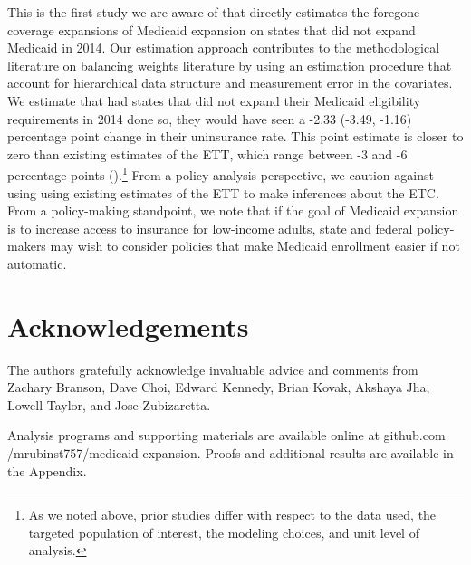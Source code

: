 \documentclass[aoas]{imsart}
\theoremstyle{plain}
\theoremstyle{remark}
\begin{document}
This is the first study we are aware of that directly estimates the foregone coverage expansions of Medicaid expansion on states that did not expand Medicaid in 2014. Our estimation approach contributes to the methodological literature on balancing weights literature by using an estimation procedure that account for hierarchical data structure and measurement error in the covariates. We estimate that had states that did not expand their Medicaid eligibility requirements in 2014 done so, they would have seen a -2.33 (-3.49, -1.16) percentage point change in their uninsurance rate. This point estimate is closer to zero than existing estimates of the ETT, which range between -3 and -6 percentage points (\cite{frean2017premium}).\footnote{As we noted above, prior studies differ with respect to the data used, the targeted population of interest, the modeling choices, and unit level of analysis.} From a policy-analysis perspective, we caution against using using existing estimates of the ETT to make inferences about the ETC. From a policy-making standpoint, we note that if the goal of Medicaid expansion is to increase access to insurance for low-income adults, state and federal policy-makers may wish to consider policies that make Medicaid enrollment easier if not automatic.

\section*{Acknowledgements}

The authors gratefully acknowledge invaluable advice and comments from Zachary Branson, Dave Choi, Edward Kennedy, Brian Kovak, Akshaya Jha, Lowell Taylor, and Jose Zubizaretta.

\begin{supplement}
Analysis programs and supporting materials are available online at github.com /mrubinst757/medicaid-expansion. Proofs and additional results are available in the Appendix.
\end{supplement}


\clearpage

\appendix










%


\end{document}

